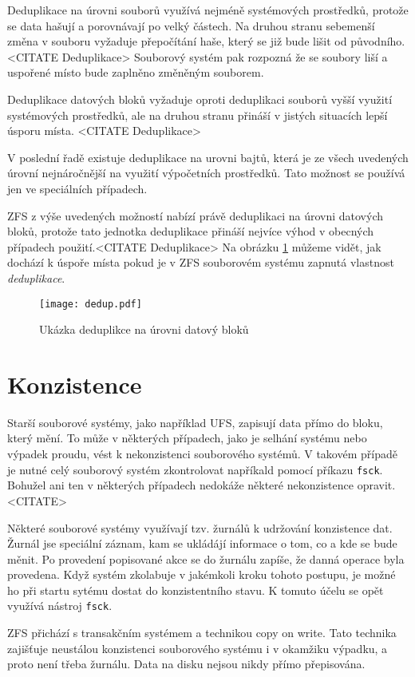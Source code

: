 Deduplikace na úrovni souborů využívá nejméně systémových prostředků, protože se data hašují a porovnávají po velký částech. Na druhou stranu sebemenší změna v souboru vyžaduje přepočítání haše, který se již bude lišit od původního.<CITATE Deduplikace> Souborový systém pak rozpozná že se soubory liší a uspořené místo bude zaplněno změněným souborem.

Deduplikace datových bloků vyžaduje oproti deduplikaci souborů vyšší využití systémových prostředků, ale na druhou stranu přináší v jistých situacích lepší úsporu místa. <CITATE Deduplikace>

V poslední řadě existuje deduplikace na urovni bajtů, která je ze všech uvedených úrovní nejnáročnější na využití výpočetních prostředků. Tato možnost se používá jen ve speciálních případech.

ZFS z výše uvedených možností nabízí právě deduplikaci na úrovni datových bloků, protože tato jednotka deduplikace přináší nejvíce výhod v obecných případech použití.<CITATE Deduplikace> Na obrázku \ref{blockdedup} můžeme vidět, jak dochází k úspoře místa pokud je v ZFS souborovém systému zapnutá vlastnost \emph{deduplikace}.
\begin{figure}[!h]
    \caption{Ukázka deduplikce na úrovni datový bloků}
    \label{blockdedup}
    \texttt{[image: dedup.pdf]}
\end{figure}
\section{Konzistence}
\label{consitence}
Starší souborové systémy, jako například UFS, zapisují data přímo do bloku, který mění. To může v některých případech, jako je selhání systému nebo výpadek proudu, vést k nekonzistenci souborového systémů. V takovém případě je nutné celý souborový systém zkontrolovat napříkald pomocí příkazu \verb|fsck|. Bohužel ani ten v některých případech
nedokáže některé nekonzistence opravit. <CITATE>

Některé souborové systémy využívají tzv. žurnálů k udržování konzistence dat. Žurnál jse speciální záznam, kam se ukládájí informace o tom, co a kde se bude měnit. Po provedení popisované akce se do žurnálu zapíše, že danná operace byla provedena. Když systém zkolabuje v jakémkoli kroku tohoto postupu, je možné ho při startu sytému dostat do konzistentního stavu. K tomuto účelu se opět využívá nástroj \verb|fsck|.

ZFS přichází s transakčním systémem a technikou copy on write. Tato technika zajišťuje neustálou konzistenci souborového systému i v okamžiku výpadku, a proto není třeba žurnálu. Data na disku nejsou nikdy přímo přepisována.

